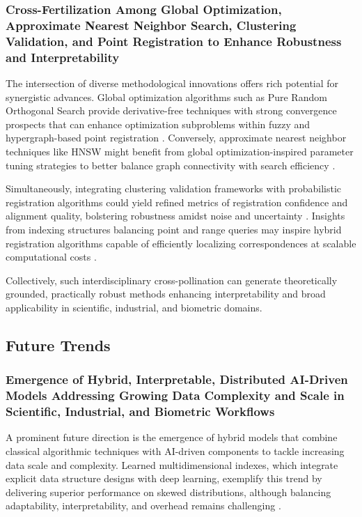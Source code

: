 \documentclass[11pt]{article}
\begin{document}
\subsubsection{Cross-Fertilization Among Global Optimization, Approximate Nearest Neighbor Search, Clustering Validation, and Point Registration to Enhance Robustness and Interpretability}

The intersection of diverse methodological innovations offers rich potential for synergistic advances. Global optimization algorithms such as Pure Random Orthogonal Search provide derivative-free techniques with strong convergence prospects that can enhance optimization subproblems within fuzzy and hypergraph-based point registration \cite{ref8, ref6}. Conversely, approximate nearest neighbor techniques like HNSW might benefit from global optimization-inspired parameter tuning strategies to better balance graph connectivity with search efficiency \cite{ref4}.

Simultaneously, integrating clustering validation frameworks with probabilistic registration algorithms could yield refined metrics of registration confidence and alignment quality, bolstering robustness amidst noise and uncertainty \cite{ref24, ref5}. Insights from indexing structures balancing point and range queries may inspire hybrid registration algorithms capable of efficiently localizing correspondences at scalable computational costs \cite{ref35}.

Collectively, such interdisciplinary cross-pollination can generate theoretically grounded, practically robust methods enhancing interpretability and broad applicability in scientific, industrial, and biometric domains.

\subsection{Future Trends}

\subsubsection{Emergence of Hybrid, Interpretable, Distributed AI-Driven Models Addressing Growing Data Complexity and Scale in Scientific, Industrial, and Biometric Workflows}

A prominent future direction is the emergence of hybrid models that combine classical algorithmic techniques with AI-driven components to tackle increasing data scale and complexity. Learned multidimensional indexes, which integrate explicit data structure designs with deep learning, exemplify this trend by delivering superior performance on skewed distributions, although balancing adaptability, interpretability, and overhead remains challenging \cite{ref33}.
\end{document}
